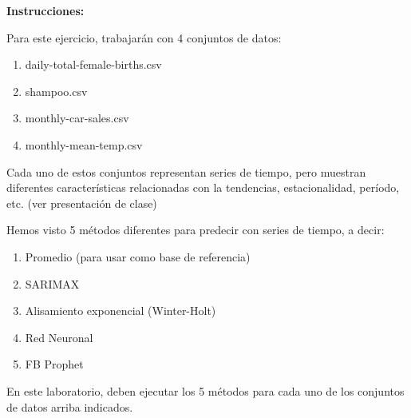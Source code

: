 





\textbf{Instrucciones:} 

Para este ejercicio, trabajarán con 4 conjuntos de datos:
\begin{enumerate}
	\item daily-total-female-births.csv
	\item shampoo.csv
	\item monthly-car-sales.csv
	\item monthly-mean-temp.csv
\end{enumerate}
Cada uno de estos conjuntos representan series de tiempo, pero muestran diferentes características relacionadas con la tendencias, estacionalidad, período, etc. (ver presentación de clase)

Hemos visto 5 métodos diferentes para predecir con series de tiempo, a decir:  
\begin{enumerate}
	\item Promedio (para usar como base de referencia)
	\item SARIMAX
	\item Alisamiento exponencial (Winter-Holt)
	\item Red Neuronal
	\item FB Prophet
\end{enumerate}

En este laboratorio, deben ejecutar los 5 métodos para cada uno de los conjuntos de datos arriba indicados.

